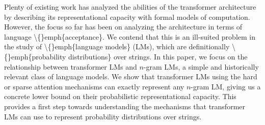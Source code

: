 Plenty of existing work has analyzed the abilities of the transformer architecture by describing its representational capacity with formal models of computation.     However, the focus so far has been on analyzing the architecture in terms of language \textbackslash\{\}emph\{acceptance\}.     We contend that this is an ill-suited problem in the study of \textbackslash\{\}emph\{language models\} (LMs), which are definitionally \textbackslash\{\}emph\{probability distributions\} over strings.     In this paper, we focus on the relationship between transformer LMs and $n$-gram LMs, a simple and historically relevant class of language models.      We show that transformer LMs using the hard or sparse attention mechanisms can exactly represent any $n$-gram LM, giving us a concrete lower bound on their probabilistic representational capacity.     This provides a first step towards understanding the mechanisms that transformer LMs can use to represent probability distributions over strings.